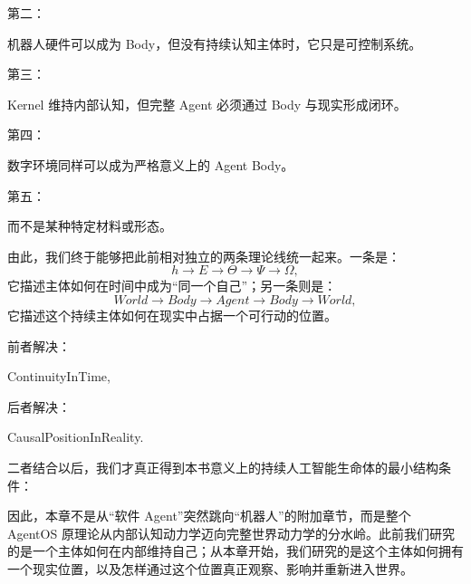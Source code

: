 第二：
\begin{statementbox}
\centering
{}
\end{statementbox}
机器人硬件可以成为 Body，但没有持续认知主体时，它只是可控制系统。

第三：
\begin{statementbox}
\centering
{}
\end{statementbox}
Kernel 维持内部认知，但完整 Agent 必须通过 Body 与现实形成闭环。

第四：
\begin{statementbox}
\centering
{}
\end{statementbox}
数字环境同样可以成为严格意义上的 Agent Body。

第五：
\begin{statementbox}
\centering
{}
\end{statementbox}
而不是某种特定材料或形态。

由此，我们终于能够把此前相对独立的两条理论线统一起来。一条是：
\[
h
\rightarrow
E
\rightarrow
\Theta
\rightarrow
\Psi
\rightarrow
\Omega,
\]
它描述主体如何在时间中成为“同一个自己”；另一条则是：
\[
World
\rightarrow
Body
\rightarrow
Agent
\rightarrow
Body
\rightarrow
World,
\]
它描述这个持续主体如何在现实中占据一个可行动的位置。

前者解决：
\begin{statementbox}
ContinuityInTime,
\end{statementbox}
后者解决：
\begin{statementbox}
CausalPositionInReality.
\end{statementbox}
二者结合以后，我们才真正得到本书意义上的持续人工智能生命体的最小结构条件：

\begin{statementbox}
\centering
{}
\end{statementbox}

因此，本章不是从“软件 Agent”突然跳向“机器人”的附加章节，而是整个 AgentOS 原理论从内部认知动力学迈向完整世界动力学的分水岭。此前我们研究的是一个主体如何在内部维持自己；从本章开始，我们研究的是这个主体如何拥有一个现实位置，以及怎样通过这个位置真正观察、影响并重新进入世界。
